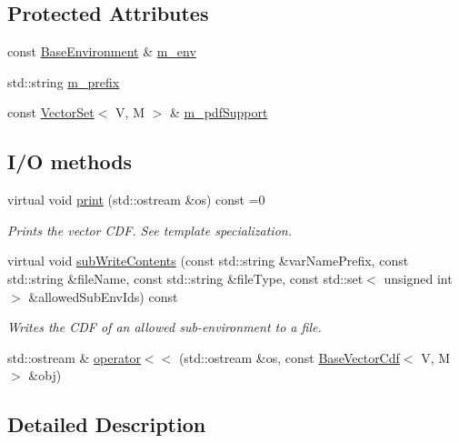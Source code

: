 \subsection*{Protected Attributes}
\begin{DoxyCompactItemize}
\item 
const \hyperlink{class_q_u_e_s_o_1_1_base_environment}{Base\-Environment} \& \hyperlink{class_q_u_e_s_o_1_1_base_vector_cdf_aa1effe370ac016f1fc7eaf538c5751a6}{m\-\_\-env}
\item 
std\-::string \hyperlink{class_q_u_e_s_o_1_1_base_vector_cdf_ac88b657f25153ab6c03bd65b64cada52}{m\-\_\-prefix}
\item 
const \hyperlink{class_q_u_e_s_o_1_1_vector_set}{Vector\-Set}$<$ V, M $>$ \& \hyperlink{class_q_u_e_s_o_1_1_base_vector_cdf_a4e083383c98725fa83c5c8c133dcfea4}{m\-\_\-pdf\-Support}
\end{DoxyCompactItemize}
\subsection*{I/\-O methods}
\begin{DoxyCompactItemize}
\item 
virtual void \hyperlink{class_q_u_e_s_o_1_1_base_vector_cdf_a1ab6a49295542017bae6c5853398223f}{print} (std\-::ostream \&os) const =0
\begin{DoxyCompactList}\small\item\em Prints the vector C\-D\-F. See template specialization. \end{DoxyCompactList}\item 
virtual void \hyperlink{class_q_u_e_s_o_1_1_base_vector_cdf_acd85c96edf9454b64fe31d6750164dfc}{sub\-Write\-Contents} (const std\-::string \&var\-Name\-Prefix, const std\-::string \&file\-Name, const std\-::string \&file\-Type, const std\-::set$<$ unsigned int $>$ \&allowed\-Sub\-Env\-Ids) const 
\begin{DoxyCompactList}\small\item\em Writes the C\-D\-F of an allowed sub-\/environment to a file. \end{DoxyCompactList}\item 
std\-::ostream \& \hyperlink{class_q_u_e_s_o_1_1_base_vector_cdf_a6da489fb178ea7354d91d756b06a0cfb}{operator$<$$<$} (std\-::ostream \&os, const \hyperlink{class_q_u_e_s_o_1_1_base_vector_cdf}{Base\-Vector\-Cdf}$<$ V, M $>$ \&obj)
\end{DoxyCompactItemize}


\subsection{Detailed Description}
